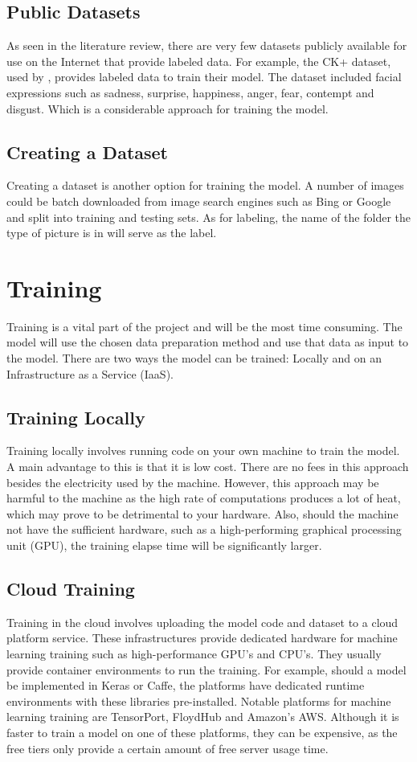 \subsection{Public Datasets}
As seen in the literature review, there are very few datasets publicly available for use on the Internet that provide labeled data. For example, the CK+ dataset, used by \citeauthor{LOPES}, provides labeled data to train their model. The dataset included facial expressions such as sadness, surprise, happiness, anger, fear, contempt and disgust. Which is a considerable approach for training the model.

\subsection{Creating a Dataset}
Creating a dataset is another option for training the model. A number of images could be batch downloaded from image search engines such as Bing or Google and split into training and testing sets. As for labeling, the name of the folder the type of picture is in will serve as the label.

\section{Training}
Training is a vital part of the project and will be the most time consuming. The model will use the chosen data preparation method and use that data as input to the model. There are two ways the model can be trained: Locally and on an Infrastructure as a Service (IaaS).

\subsection{Training Locally}
Training locally involves running code on your own machine to train the model. A main advantage to this is that it is low cost. There are no fees in this approach besides the electricity used by the machine. However, this approach may be harmful to the machine as the high rate of computations produces a lot of heat, which may prove to be detrimental to your hardware. Also, should the machine not have the sufficient hardware, such as a high-performing graphical processing unit (GPU), the training elapse time will be significantly larger.

\subsection{Cloud Training}
Training in the cloud involves uploading the model code and dataset to a cloud platform service. These infrastructures provide dedicated hardware for machine learning training such as high-performance GPU's and CPU's. They usually provide container environments to run the training. For example, should a model be implemented in Keras or Caffe, the platforms have dedicated runtime environments with these libraries pre-installed. Notable platforms for machine learning training are TensorPort, FloydHub and Amazon's AWS. Although it is faster to train a model on one of these platforms, they can be expensive, as the free tiers only provide a certain amount of free server usage time.

